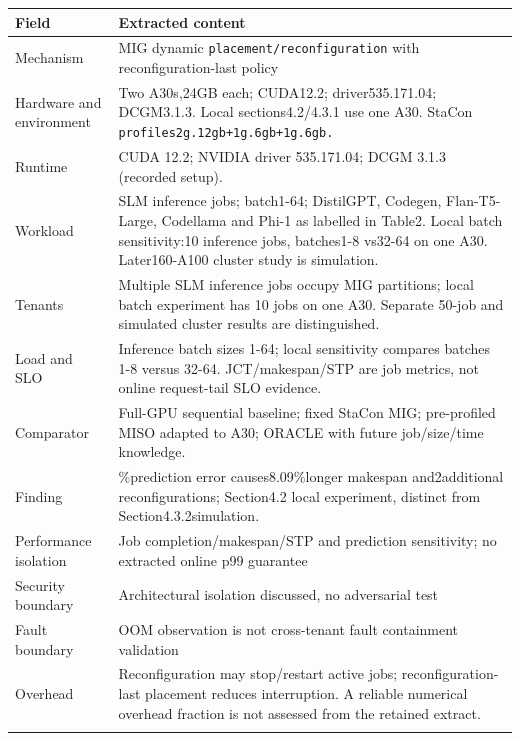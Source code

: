\cite{P020}

\begin{longtable}{>{\raggedright\arraybackslash}p{}>{\raggedright\arraybackslash}p{}}
\toprule
\textbf{Field} & \textbf{Extracted content}\\\midrule\endhead
Mechanism & MIG dynamic \nolinkurl{placement/reconfiguration} with reconfiguration-last policy\\\addlinespace
Hardware and environment & Two A30s,24GB each; CUDA12.2; driver535.171.04; DCGM3.1.3. Local sections4.2/4.3.1 use one A30. StaCon \nolinkurl{profiles2g.12gb+1g.6gb+1g.6gb.}\\\addlinespace
Runtime & CUDA 12.2; NVIDIA driver 535.171.04; DCGM 3.1.3 (recorded setup).\\\addlinespace
Workload & 50 SLM inference jobs; batch1-64; DistilGPT, Codegen, Flan-T5-Large, Codellama and Phi-1 as labelled in Table2. Local batch sensitivity:10 inference jobs, batches1-8 vs32-64 on one A30. Later160-A100 cluster study is simulation.\\\addlinespace
Tenants & Multiple SLM inference jobs occupy MIG partitions; local batch experiment has 10 jobs on one A30. Separate 50-job and simulated cluster results are distinguished.\\\addlinespace
Load and SLO & Inference batch sizes 1-64; local sensitivity compares batches 1-8 versus 32-64. JCT/makespan/STP are job metrics, not online request-tail SLO evidence.\\\addlinespace
Comparator & Full-GPU sequential baseline; fixed StaCon MIG; pre-profiled MISO adapted to A30; ORACLE with future job/size/time knowledge.\\\addlinespace
Finding & 15\%prediction error causes8.09\%longer makespan and2additional reconfigurations; Section4.2 local experiment, distinct from Section4.3.2simulation.\\\addlinespace
Performance isolation & Job completion/makespan/STP and prediction sensitivity; no extracted online p99 guarantee\\\addlinespace
Security boundary & Architectural isolation discussed, no adversarial test\\\addlinespace
Fault boundary & OOM observation is not cross-tenant fault containment validation\\\addlinespace
Overhead & Reconfiguration may stop/restart active jobs; reconfiguration-last placement reduces interruption. A reliable numerical overhead fraction is not assessed from the retained extract.\\\addlinespace

\end{longtable}
